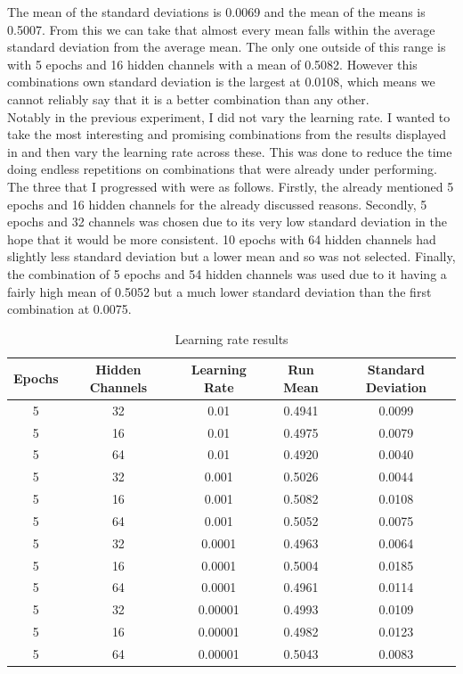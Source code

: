\documentclass{l4proj}
\begin{document}
The mean of the standard deviations is 0.0069 and the mean of the means is 0.5007. From this we can take that almost every mean falls within the average standard deviation from the average mean. The only one outside of this range is with 5 epochs and 16 hidden channels with a mean of 0.5082. However this combinations own standard deviation is the largest at 0.0108, which means we cannot reliably say that it is a better combination than any other.\\

Notably in the previous experiment, I did not vary the learning rate. I wanted to take the most interesting and promising combinations from the results displayed in  and then vary the learning rate across these. This was done to reduce the time doing endless repetitions on combinations that were already under performing. The three that I progressed with were as follows. Firstly, the already mentioned 5 epochs and 16 hidden channels for the already discussed reasons. Secondly, 5 epochs and 32 channels was chosen due to its very low standard deviation in the hope that it would be more consistent. 10 epochs with 64 hidden channels had slightly less standard deviation but a lower mean and so was not selected. Finally, the combination of 5 epochs and 54 hidden channels was used due to it having a fairly high mean of 0.5052 but a much lower standard deviation than the first combination at 0.0075. \\

\begin{table}[h]
    \centering
    \caption{Learning rate results}
    \label{tab:Learnng_rate_results}
    \begin{tabular}{|c|c|c|c|c|}
        \hline
        \textbf{Epochs} & \textbf{Hidden Channels} & \textbf{Learning Rate} & \textbf{Run Mean} & \textbf{Standard Deviation} \\ \hline
        5 & 32 & 0.01 & 0.4941 & 0.0099 \\ \hline
        5 & 16 & 0.01 &  0.4975 & 0.0079 \\ \hline
        5 & 64 & 0.01 & 0.4920 & 0.0040 \\ \hline
        5 & 32 & 0.001 & 0.5026 & 0.0044 \\ \hline
        5 & 16 & 0.001 & 0.5082 & 0.0108 \\ \hline
        5 & 64 & 0.001 & 0.5052 & 0.0075 \\ \hline
        5 & 32 & 0.0001 & 0.4963 & 0.0064 \\ \hline
        5 & 16 & 0.0001 & 0.5004 & 0.0185 \\ \hline
        5 & 64 & 0.0001 & 0.4961 & 0.0114 \\ \hline
        5 & 32 & 0.00001 & 0.4993 & 0.0109 \\ \hline
        5 & 16 & 0.00001 & 0.4982 & 0.0123 \\ \hline
        5 & 64 & 0.00001 & 0.5043 & 0.0083 \\ \hline
    \end{tabular}
\end{table}
\end{document}

